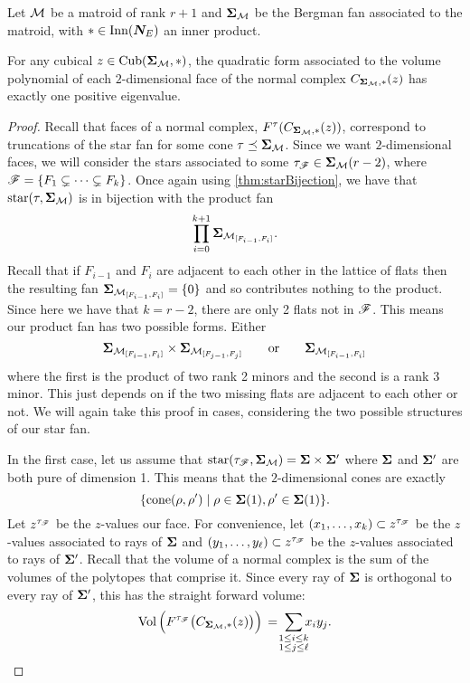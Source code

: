 \documentclass[12pt,oneside]{../../sfsuthesis}
\begin{document}
\begin{lemma}\th\label{thm:matroidOnePosEigen}

    Let \( \mathcal{M} \) be a matroid of rank \( r + 1 \) and \( \bm{\Sigma}_{\mathcal{M}} \) be the Bergman fan associated to the matroid, with \( \ast \in \mathrm{Inn}(\bm{N}_E) \) an inner product.

    For any cubical \( z \in \operatorname{Cub}(\bm{\Sigma}_{\mathcal{M}}, \ast) \), the quadratic form associated to the volume polynomial of each \( 2 \)-dimensional face of the normal complex \( C_{\bm{\Sigma}_{\mathcal{M}},\ast}(z) \)  has exactly one positive eigenvalue.

\end{lemma}
\begin{proof}
    Recall that faces of a normal complex, \( F^\tau(C_{\bm{\Sigma}_{\mathcal{M}}, \ast}(z)) \), correspond to truncations of the star fan for some cone  \( \tau \preceq \bm{\Sigma}_{\mathcal{M}} \).
    Since we want \( 2 \)-dimensional faces, we will consider the stars associated to some \( \tau_{\mathscr{F}} \in \bm{\Sigma}_{\mathcal{M}}(r - 2) \), where \( \mathscr{F} = \{ F_1 \subsetneq \cdots \subsetneq F_{k} \} \).
    Once again using \th\ref{thm:starBijection}, we have that \( \operatorname{star}(\tau, \bm{\Sigma}_{\mathcal{M}}) \) is in bijection with the product fan
    \[
        \prod_{i=0}^{k+1} \bm{\Sigma}_{\mathcal{M}_{[F_{i-1}, F_i]}}.
    \]
    Recall that if \( F_{i-1} \) and \( F_i \) are adjacent to each other in the lattice of flats then the resulting fan \( \bm{\Sigma}_{\mathcal{M}_{[F_{i-1}, F_i]}} = \{ 0 \} \) and so contributes nothing to the product.
    Since here we have that \( k = r - 2 \), there are only 2 flats not in \( \mathscr{F} \).
    This means our product fan has two possible forms. Either
    \[
        \bm{\Sigma}_{\mathcal{M}_{[F_{i-1}, F_i]}} \times \bm{\Sigma}_{\mathcal{M}_{[F_{j-1}, F_j]}}
        \quad \quad \text{or} \quad \quad
        \bm{\Sigma}_{\mathcal{M}_{[F_{i-1}, F_i]}}
    \]
    where the first is the product of two rank 2 minors and the second is a rank 3 minor.
    This just depends on if the two missing flats are adjacent to each other or not.
    We will again take this proof in cases, considering the two possible structures of our star fan.

    In the first case, let us assume that \( \operatorname{star}(\tau_{\mathscr{F}}, \bm{\Sigma}_{\mathcal{M}}) = \bm{\Sigma} \times \bm{\Sigma}' \) where  \( \bm{\Sigma} \) and  \( \bm{\Sigma}' \) are both pure of dimension 1.
    This means that the \( 2 \)-dimensional cones are exactly
    \[
        \{ \mathrm{cone}(\rho, \rho') \; | \; \rho \in \bm{\Sigma}(1), \rho' \in \bm{\Sigma}(1) \}.
    \]
    Let \( z^{\tau_{\mathscr{F}}} \) be the \( z \)-values our face.
    For convenience, let \( (x_1, \dots, x_k) \subset z^{\tau_{\mathscr{F}}} \) be the \( z \)-values associated to rays of \( \bm{\Sigma} \) and
    \( (y_1, \dots, y_\ell) \subset z^{\tau_{\mathscr{F}}} \) be the \( z \)-values associated to rays of \( \bm{\Sigma}' \).
    Recall that the volume of a normal complex is the sum of the volumes of the polytopes that comprise it.
    Since every ray of \( \bm{\Sigma} \) is orthogonal to every ray of \( \bm{\Sigma}' \), this has the straight forward volume:
    \[
        \Vol\Big(F^{\tau_\scrF}\big(C_{\bSigma_{\cM}, \ast}(z)\big)\Big) \, = \; \sum_{\mathclap{\substack{1 \leq i \leq k \\ 1 \leq j \leq \ell}}} x_i y_j.
    \]


\end{proof}
\end{document}
